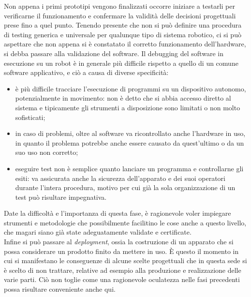 \indent Non appena i primi prototipi vengono finalizzati occorre iniziare a testarli per verificarne il funzionamento e confermare la validità delle decisioni progettuali prese fino a quel punto. Tenendo presente che non si può definire una procedura di testing generica e universale per qualunque tipo di sistema robotico, ci si può aspettare che non appena si è constatato il corretto funzionamento dell'hardware, si debba passare alla validazione del software. Il debugging del software in esecuzione su un robot è in generale più difficile rispetto a quello di un comune software applicativo, e ciò a causa di diverse specificità:
\begin{itemize}
    \item è più difficile tracciare l'esecuzione di programmi su un dispositivo autonomo, potenzialmente in movimento: non è detto che si abbia accesso diretto al sistema e tipicamente gli strumenti a disposizione sono limitati o non molto sofisticati;
    \item in caso di problemi, oltre al software va ricontrollato anche l'hardware in uso, in quanto il problema potrebbe anche essere causato da quest'ultimo o da un suo uso non corretto;
    \item eseguire test non è semplice quanto lanciare un programma e controllarne gli esiti: va assicurata anche la sicurezza dell'apparato e dei suoi operatori durante l'intera procedura, motivo per cui già la sola organizzazione di un test può risultare impegnativa.
\end{itemize}
Date la difficoltà e l'importanza di questa fase, è ragionevole voler impiegare strumenti e metodologie che possibilmente facilitino le cose anche a questo livello, che magari siano già state adeguatamente validate e certificate.\\
Infine si può passare al \emph{deployment}, ossia la costruzione di un apparato che si possa considerare un prodotto finito da mettere in uso. È questo il momento in cui si manifestano le conseguenze di alcune scelte progettuali che in questa sede si è scelto di non trattare, relative ad esempio alla produzione e realizzazione delle varie parti. Ciò non toglie come una ragionevole oculatezza nelle fasi precedenti possa risultare conveniente anche qui.\hfill

\vspace{\baselineskip}


